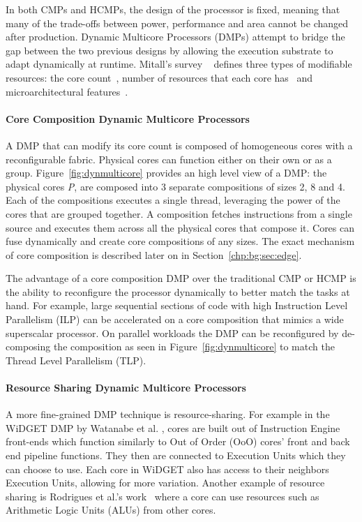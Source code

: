 In both CMPs and HCMPs, the design of the processor is fixed, meaning that many of the trade-offs between power, performance and area cannot be changed after production.
Dynamic Multicore Processors (DMPs) attempt to bridge the gap between the two previous designs by allowing the execution substrate to adapt dynamically at runtime.
Mitall's survey ~\cite{MittalSurv2016} defines three types of modifiable resources: the core count~\cite{ipek2007CoreFusion,kim2007tflex,pricopi2012bahurupi}, number of resources that each core has~\cite{Homayoun3DPooling2012} and microarchitectural features~\cite{fallinhetblock2014,BauerRSE08,tavanaElastic}.

\paragraph*{Core Composition Dynamic Multicore Processors}


A DMP that can modify its core count is composed of homogeneous cores with a reconfigurable fabric.
Physical cores can function either on their own or as a group.
Figure~\ref{fig:dynmulticore} provides an high level view of a DMP: the physical cores \textit{P}, are composed into 3 separate compositions of sizes 2, 8 and 4.
Each of the compositions executes a single thread, leveraging the power of the cores that are grouped together.
A composition fetches instructions from a single source and executes them across all the physical cores that compose it.
Cores can fuse dynamically and create core compositions of any sizes.
The exact mechanism of core composition is described later on in Section~\ref{chp:bg:sec:edge}.

The advantage of a core composition DMP over the traditional CMP or HCMP is the ability to reconfigure the processor dynamically to better match the tasks at hand.
For example, large sequential sections of code with high Instruction Level Parallelism (ILP) can be accelerated on a core composition that mimics a wide superscalar processor.
On parallel workloads the DMP can be reconfigured by de-composing the composition as seen in Figure~\ref{fig:dynmulticore} to match the Thread Level Parallelism (TLP).

\paragraph*{Resource Sharing Dynamic Multicore Processors}
A more fine-grained DMP technique is resource-sharing.
For example in the WiDGET DMP by Watanabe et al. \cite{Watanabe2010Widget}, cores are built out of Instruction Engine front-ends which function similarly to Out of Order (OoO) cores' front and back end pipeline functions.
They then are connected to Execution Units which they can choose to use.
Each core in WiDGET also has access to their neighbors Execution Units, allowing for more variation.
Another example of resource sharing is Rodrigues et al.'s work~\cite{rodrigues2014perf} where a core can use resources such as Arithmetic Logic Units (ALUs) from other cores.

